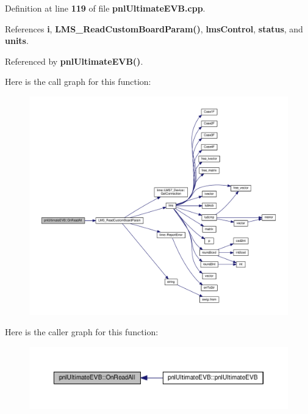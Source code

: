 Definition at line {\bf 119} of file {\bf pnl\+Ultimate\+E\+V\+B.\+cpp}.



References {\bf i}, {\bf L\+M\+S\+\_\+\+Read\+Custom\+Board\+Param()}, {\bf lms\+Control}, {\bf status}, and {\bf units}.



Referenced by {\bf pnl\+Ultimate\+E\+V\+B()}.



Here is the call graph for this function\+:
\nopagebreak
\begin{figure}[H]
\begin{center}
\leavevmode
\includegraphics[width=350pt]{d7/da7/classpnlUltimateEVB_a647ade35356fbc3da814b7d35d41f110_cgraph}
\end{center}
\end{figure}




Here is the caller graph for this function\+:
\nopagebreak
\begin{figure}[H]
\begin{center}
\leavevmode
\includegraphics[width=350pt]{d7/da7/classpnlUltimateEVB_a647ade35356fbc3da814b7d35d41f110_icgraph}
\end{center}
\end{figure}


